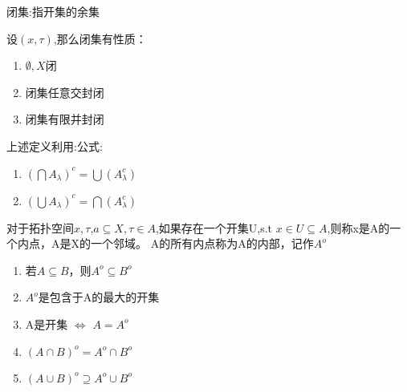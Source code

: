 \begin{definition}
    闭集:指开集的余集
\end{definition}
\begin{theorem}
    设\(\left(x,\tau\right)\),那么闭集有性质：
    \begin{enumerate}
        \item \(\emptyset,X\)闭 \\
        \item 闭集任意交封闭 \\
        \item 闭集有限并封闭
    \end{enumerate}
\end{theorem}
\begin{note}
    上述定义利用:公式:
    \begin{enumerate}
        \item \({(\bigcap A_{\lambda})}^{c}=\bigcup(A_{\lambda}^{c})\) \\
        \item \({(\bigcup A_{\lambda})}^{c}=\bigcap(A_{\lambda}^{c})\)
    \end{enumerate}
\end{note}
\begin{definition}
    对于拓扑空间\(x,\tau\),\(a \subseteq X,\tau \in A\),如果存在一个开集U,s.t \(x \in U \subseteq A\),则称x是A的一个内点，A是X的一个邻域。
    A的所有内点称为A的内部，记作\(A^{o}\)
\end{definition}
\begin{corollary}
    \begin{enumerate}
        \item 若\(A \subseteq B\)，则\(A^{o}\subseteq B^{o}\) \\
        \item \(A^{o}\)是包含于A的最大的开集\\
        \item A是开集 \(\Longleftrightarrow \) \(A=A^{o}\) \\
        \item \({\left(A \cap B\right)}^{o} = {A}^{o}\cap {B}^{o}\)\\
        \item \({\left(A \cup B\right)}^{o} \supseteq A^{o}\cup B^{o}\)
    \end{enumerate}
\end{corollary}
